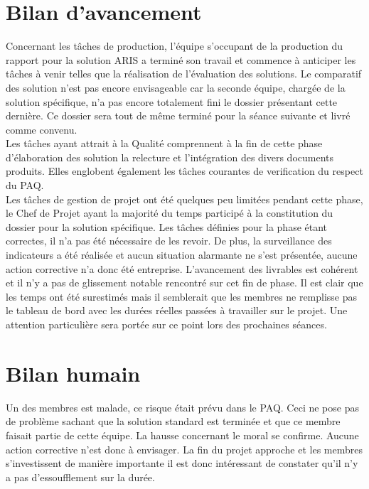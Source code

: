 
\section{Bilan d'avancement}

Concernant les tâches de production, l'équipe s'occupant de la production du rapport pour la solution ARIS a terminé son travail et commence à anticiper les tâches à venir telles que la réalisation de l'évaluation des solutions. Le comparatif des solution n'est pas encore envisageable car la seconde équipe, chargée de la solution spécifique, n'a pas encore totalement fini le dossier présentant cette dernière. Ce dossier sera tout de même terminé pour la séance suivante et livré comme convenu.\\

Les tâches ayant attrait à la Qualité comprennent à la fin de cette phase d'élaboration des solution la relecture et l'intégration des divers documents produits. Elles englobent également les tâches courantes de verification du respect du PAQ.\\

Les tâches de gestion de projet ont été quelques peu limitées pendant cette phase, le Chef de Projet ayant la majorité du temps participé à la constitution du dossier pour la solution spécifique. Les tâches définies pour la phase étant correctes, il n'a pas été nécessaire de les revoir. De plus, la surveillance des indicateurs a été réalisée et aucun situation alarmante ne s'est présentée, aucune action corrective n'a donc été entreprise. L'avancement des livrables est cohérent et il n'y a pas de glissement notable rencontré sur cet fin de phase. Il est clair que les temps ont été surestimés mais il semblerait que les membres ne remplisse pas le tableau de bord avec les durées réelles passées à travailler sur le projet. Une attention particulière sera portée sur ce point lors des prochaines séances.

\section{Bilan humain}

Un des membres est malade, ce risque était prévu dans le PAQ. Ceci ne pose pas de problème sachant que la solution standard est terminée et que ce membre faisait partie de cette équipe. La hausse concernant le moral se confirme. Aucune action corrective n'est donc à envisager. La fin du projet approche et les membres s'investissent de manière importante il est donc intéressant de constater qu'il n'y a pas d'essoufflement sur la durée.
